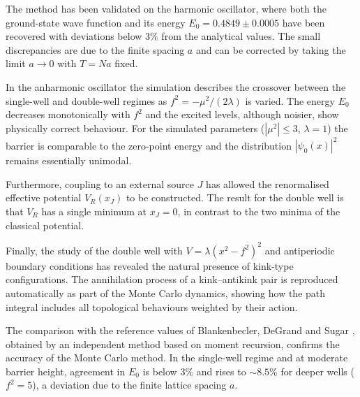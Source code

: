 \documentclass[11pt,a4paper,twoside,pdf]{article}
\numberwithin{equation}{section}
\begin{document}
The method has been validated on the harmonic oscillator, where both the ground-state wave function and its energy $E_0 = 0.4849 \pm 0.0005$ have been recovered with deviations below $3\%$ from the analytical values. The small discrepancies are due to the finite spacing $a$ and can be corrected by taking the limit $a \to 0$ with $T = Na$ fixed.

In the anharmonic oscillator the simulation describes the crossover between the single-well and double-well regimes as $f^2 = -\mu^2/(2\lambda)$ is varied. The energy $E_0$ decreases monotonically with $f^2$ and the excited levels, although noisier, show physically correct behaviour. For the simulated parameters ($|\mu^2| \le 3$, $\lambda = 1$) the barrier is comparable to the zero-point energy and the distribution $|\psi_0(x)|^2$ remains essentially unimodal.

Furthermore, coupling to an external source $J$ has allowed the renormalised effective potential $V_R(x_J)$ to be constructed. The result for the double well is that $V_R$ has a single minimum at $x_J = 0$, in contrast to the two minima of the classical potential.

Finally, the study of the double well with $V = \lambda(x^2-f^2)^2$ and antiperiodic boundary conditions has revealed the natural presence of kink-type configurations. The annihilation process of a kink--antikink pair is reproduced automatically as part of the Monte Carlo dynamics, showing how the path integral includes all topological behaviours weighted by their action.


The comparison with the reference values of Blankenbecler, DeGrand and Sugar \cite{degrand1980numerical}, obtained by an independent method based on moment recursion, confirms the accuracy of the Monte Carlo method. In the single-well regime and at moderate barrier height, agreement in $E_0$ is below $3\%$ and rises to $\sim 8.5\%$ for deeper wells ($f^2 = 5$), a deviation due to the finite lattice spacing $a$.



\newpage




\end{document}

